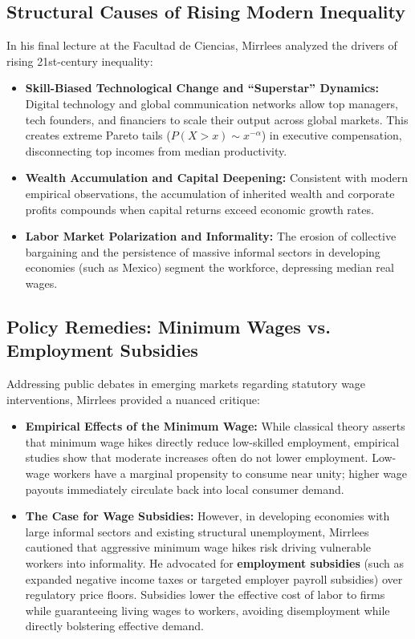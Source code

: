 \documentclass[11pt,a4paper]{article}
\begin{document}
\subsection{Structural Causes of Rising Modern Inequality}
In his final lecture at the Facultad de Ciencias, Mirrlees analyzed the drivers of rising 21st-century inequality:
\begin{itemize}
    \item \textbf{Skill-Biased Technological Change and ``Superstar'' Dynamics:} Digital technology and global communication networks allow top managers, tech founders, and financiers to scale their output across global markets. This creates extreme Pareto tails ($P(X > x) \sim x^{-\alpha}$) in executive compensation, disconnecting top incomes from median productivity.
    \item \textbf{Wealth Accumulation and Capital Deepening:} Consistent with modern empirical observations, the accumulation of inherited wealth and corporate profits compounds when capital returns exceed economic growth rates.
    \item \textbf{Labor Market Polarization and Informality:} The erosion of collective bargaining and the persistence of massive informal sectors in developing economies (such as Mexico) segment the workforce, depressing median real wages.
\end{itemize}

\subsection{Policy Remedies: Minimum Wages vs. Employment Subsidies}
Addressing public debates in emerging markets regarding statutory wage interventions, Mirrlees provided a nuanced critique:
\begin{itemize}
    \item \textbf{Empirical Effects of the Minimum Wage:} While classical theory asserts that minimum wage hikes directly reduce low-skilled employment, empirical studies show that moderate increases often do not lower employment. Low-wage workers have a marginal propensity to consume near unity; higher wage payouts immediately circulate back into local consumer demand.
    \item \textbf{The Case for Wage Subsidies:} However, in developing economies with large informal sectors and existing structural unemployment, Mirrlees cautioned that aggressive minimum wage hikes risk driving vulnerable workers into informality. He advocated for \textbf{employment subsidies} (such as expanded negative income taxes or targeted employer payroll subsidies) over regulatory price floors. Subsidies lower the effective cost of labor to firms while guaranteeing living wages to workers, avoiding disemployment while directly bolstering effective demand.
\end{itemize}
\end{document}
